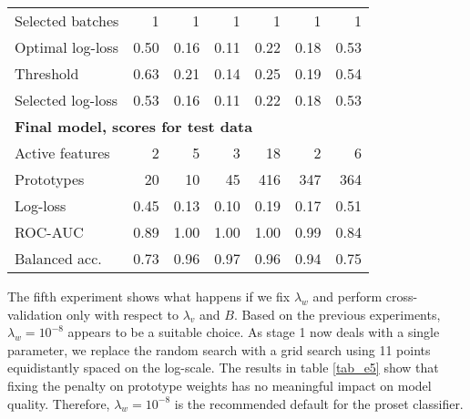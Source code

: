 \begin{table}
\begin{center}
\begin{tabular}{|lrrrrrr|}
Selected batches&1&1&1&1&1&1\\
Optimal log-loss&0.50&0.16&0.11&0.22&0.18&0.53\\
Threshold&0.63&0.21&0.14&0.25&0.19&0.54\\
Selected log-loss&0.53&0.16&0.11&0.22&0.18&0.53\\
\multicolumn{7}{|l|}{\textbf{Final model, scores for test data}}\\
Active features&2&5&3&18&2&6\\
Prototypes&20&10&45&416&347&364\\
Log-loss&0.45&0.13&0.10&0.19&0.17&0.51\\
ROC-AUC&0.89&1.00&1.00&1.00&0.99&0.84\\
Balanced acc.&0.73&0.96&0.97&0.96&0.94&0.75\\
\hline
\end{tabular}
\end{center}
\end{table}
%
The fifth experiment shows what happens if we fix $\lambda_w$ and perform cross-validation only with respect to $\lambda_v$ and $B$.
Based on the previous experiments, $\lambda_w=10^{-8}$ appears to be a suitable choice.
As stage 1 now deals with a single parameter, we replace the random search with a grid search using 11 points equidistantly spaced on the log-scale.
The results in table \ref{tab_e5} show that fixing the penalty on prototype weights has no meaningful impact on model quality.
Therefore, $\lambda_w=10^{-8}$ is the recommended default for the proset classifier.\par
%
